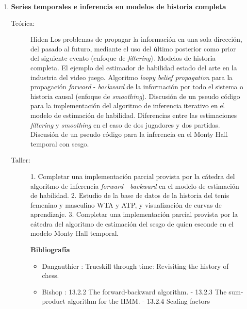 \documentclass[11pt]{article}
\begin{document}
\begin{enumerate}
\item \textbf{Series temporales e inferencia en modelos de historia completa}
\vspace{-0.15cm}
\begin{description}
\item[Teórica:] Hiden Los problemas de propagar la información en una sola dirección, del pasado al futuro, mediante el uso del último posterior como prior del siguiente evento (enfoque de \emph{filtering}).
Modelos de historia completa.
El ejemplo del estimador de habilidad estado del arte en la industria del video juego.
Algoritmo \emph{loopy belief propagation} para la propagación \emph{forward} - \emph{backward} de la información por todo el sistema o historia causal (enfoque de \emph{smoothing}).
Discusión de un pseudo código para la implementación del algoritmo de inferencia iterativo en el modelo de estimación de habilidad.
Diferencias entre las estimaciones \emph{filtering} y \emph{smoothing} en el caso de dos jugadores y dos partidas.
Discusión de un pseudo código para la inferencia en el Monty Hall temporal con sesgo.
\item[Taller:]
1. Completar una implementación parcial provista por la cátedra del algoritmo de inferencia \emph{forward} - \emph{backward} en el modelo de estimación de habilidad.
2. Estudio de la base de datos de la historia del tenis femenino y masculino WTA y ATP, y visualización de curvas de aprendizaje.
3. Completar una implementación parcial provista por la cátedra del algoritmo de estimación del sesgo de quien esconde en el modelo Monty Hall temporal.
\item[] \textbf{Bibliografía}
\begin{itemize}
\item Dangauthier \cite{dangauthier2008-trueskillThroughTime}: Trueskill through time: Revisiting the history of chess.
\item Bishop \cite{bishop2006-PRML}: 13.2.2 The forward-backward algorithm. - 13.2.3 The sum-product algorithm for the HMM. - 13.2.4 Scaling factors
\end{itemize}
\end{description}



\end{enumerate}
\end{document}
